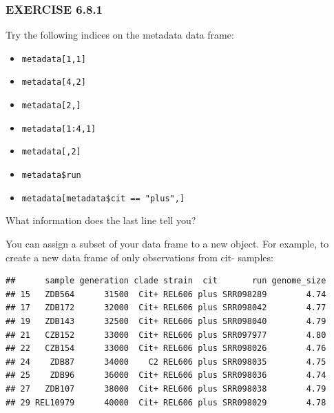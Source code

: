 \documentclass[
]{book}
\newenvironment{Shaded}{\begin{snugshade}}{\end{snugshade}}
\newcommand{\NormalTok}[1]{#1}
\newcommand{\OtherTok}[1]{\textcolor[rgb]{0.56,0.35,0.01}{#1}}
\newcommand{\SpecialCharTok}[1]{\textcolor[rgb]{0.81,0.36,0.00}{\textbf{#1}}}
\newcommand{\StringTok}[1]{\textcolor[rgb]{0.31,0.60,0.02}{#1}}
\providecommand{\tightlist}{%
  \setlength{\itemsep}{0pt}\setlength{\parskip}{0pt}}
\begin{document}
\subsubsection*{EXERCISE 6.8.1}\label{exercise-6.8.1}

Try the following indices on the metadata data frame:

\begin{itemize}
\tightlist
\item
  \texttt{metadata{[}1,1{]}}
\item
  \texttt{metadata{[}4,2{]}}
\item
  \texttt{metadata{[}2,{]}}
\item
  \texttt{metadata{[}1:4,1{]}}
\item
  \texttt{metadata{[},2{]}}
\item
  \texttt{metadata\$run}
\item
  \texttt{metadata{[}metadata\$cit\ ==\ "plus",{]}}
\end{itemize}

What information does the last line tell you?

You can assign a subset of your data frame to a new object. For example, to create a new data frame of only observations from cit- samples:

\begin{Shaded}
\end{Shaded}

\begin{verbatim}
##      sample generation clade strain  cit       run genome_size
## 15   ZDB564      31500  Cit+ REL606 plus SRR098289        4.74
## 17   ZDB172      32000  Cit+ REL606 plus SRR098042        4.77
## 19   ZDB143      32500  Cit+ REL606 plus SRR098040        4.79
## 21   CZB152      33000  Cit+ REL606 plus SRR097977        4.80
## 22   CZB154      33000  Cit+ REL606 plus SRR098026        4.76
## 24    ZDB87      34000    C2 REL606 plus SRR098035        4.75
## 25    ZDB96      36000  Cit+ REL606 plus SRR098036        4.74
## 27   ZDB107      38000  Cit+ REL606 plus SRR098038        4.79
## 29 REL10979      40000  Cit+ REL606 plus SRR098029        4.78
\end{verbatim}
\end{document}
